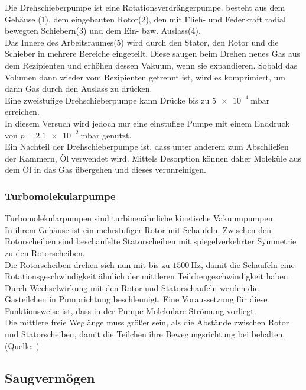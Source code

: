 			\noindent
			Die Drehschieberpumpe ist eine Rotationsverdrängerpumpe.	
			besteht aus dem Gehäuse (1), dem eingebauten Rotor(2), den mit Flieh- und Federkraft radial bewegten Schiebern(3) und dem Ein- bzw. Auslass(4).\\ 
			Das Innere des Arbeitsraumes(5) wird durch den Stator, den Rotor und die Schieber in mehrere Bereiche eingeteilt. 
			Diese saugen beim Drehen neues Gas aus dem Rezipienten und erhöhen dessen Vakuum, wenn sie expandieren.
			Sobald das Volumen dann wieder vom Rezipienten getrennt ist, wird es komprimiert, um dann Gas durch den Auslass zu drücken.\\
			Eine zweistufige Drehschieberpumpe kann Drücke bis zu $\SI{5e-4}{\milli\bar}$ erreichen. \\
			In diesem Versuch wird jedoch nur eine einstufige Pumpe mit einem Enddruck von $p = \SI{2.1 e-2}{\milli\bar}$ genutzt.\\
			Ein Nachteil der Drehschieberpumpe ist, dass unter anderem zum Abschließen der Kammern, Öl verwendet wird.
			Mittels Desorption können daher Moleküle aus dem Öl in das Gas übergehen und dieses verunreinigen.	 

		\subsubsection{Turbomolekularpumpe}
		
			\noindent
			Turbomolekularpumpen sind turbinenähnliche kinetische Vakuumpumpen.\\ 
			In ihrem Gehäuse ist ein mehrstufiger Rotor mit Schaufeln.
			Zwischen den Rotorscheiben sind beschaufelte Statorscheiben mit spiegelverkehrter Symmetrie zu den Rotorscheiben.\\
			Die Rotorscheiben drehen sich nun mit bis zu $\SI{1500}{\hertz}$, damit die Schaufeln eine Rotationsgeschwindigkeit ähnlich der mittleren Teilchengeschwindigkeit haben. \\
			Durch Wechselwirkung mit den Rotor und Statorschaufeln werden die Gasteilchen in Pumprichtung beschleunigt.
			Eine Voraussetzung für diese Funktionsweise ist, dass in der Pumpe Molekulare-Strömung vorliegt.\\ 
			Die mittlere freie Weglänge muss größer sein, als die Abstände zwischen Rotor und Statorscheiben, damit die Teilchen ihre Bewegungsrichtung bei behalten.\\
			(Quelle: \cite{pfeiffer:pump})
			  					
	\subsection{Saugvermögen}


